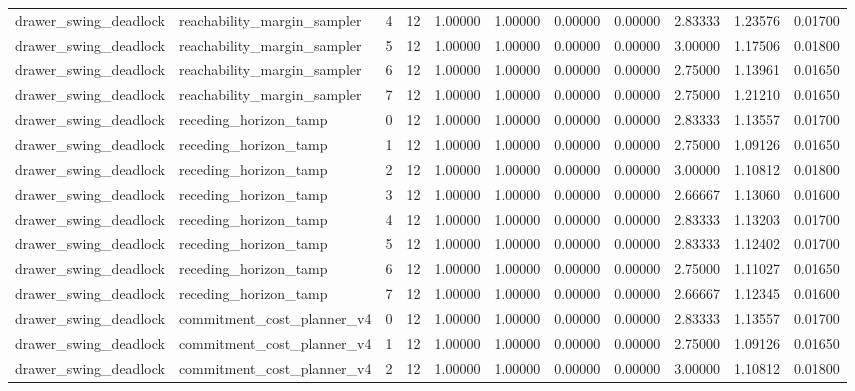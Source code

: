 \documentclass{article}
\begin{document}
\begin{table}[tbp]
{\begin{tabular}{lllllllllll}
drawer\_swing\_deadlock & reachability\_margin\_sampler & 4 & 12 & 1.00000 & 1.00000 & 0.00000 & 0.00000 & 2.83333 & 1.23576 & 0.01700 \\
drawer\_swing\_deadlock & reachability\_margin\_sampler & 5 & 12 & 1.00000 & 1.00000 & 0.00000 & 0.00000 & 3.00000 & 1.17506 & 0.01800 \\
drawer\_swing\_deadlock & reachability\_margin\_sampler & 6 & 12 & 1.00000 & 1.00000 & 0.00000 & 0.00000 & 2.75000 & 1.13961 & 0.01650 \\
drawer\_swing\_deadlock & reachability\_margin\_sampler & 7 & 12 & 1.00000 & 1.00000 & 0.00000 & 0.00000 & 2.75000 & 1.21210 & 0.01650 \\
drawer\_swing\_deadlock & receding\_horizon\_tamp & 0 & 12 & 1.00000 & 1.00000 & 0.00000 & 0.00000 & 2.83333 & 1.13557 & 0.01700 \\
drawer\_swing\_deadlock & receding\_horizon\_tamp & 1 & 12 & 1.00000 & 1.00000 & 0.00000 & 0.00000 & 2.75000 & 1.09126 & 0.01650 \\
drawer\_swing\_deadlock & receding\_horizon\_tamp & 2 & 12 & 1.00000 & 1.00000 & 0.00000 & 0.00000 & 3.00000 & 1.10812 & 0.01800 \\
drawer\_swing\_deadlock & receding\_horizon\_tamp & 3 & 12 & 1.00000 & 1.00000 & 0.00000 & 0.00000 & 2.66667 & 1.13060 & 0.01600 \\
drawer\_swing\_deadlock & receding\_horizon\_tamp & 4 & 12 & 1.00000 & 1.00000 & 0.00000 & 0.00000 & 2.83333 & 1.13203 & 0.01700 \\
drawer\_swing\_deadlock & receding\_horizon\_tamp & 5 & 12 & 1.00000 & 1.00000 & 0.00000 & 0.00000 & 2.83333 & 1.12402 & 0.01700 \\
drawer\_swing\_deadlock & receding\_horizon\_tamp & 6 & 12 & 1.00000 & 1.00000 & 0.00000 & 0.00000 & 2.75000 & 1.11027 & 0.01650 \\
drawer\_swing\_deadlock & receding\_horizon\_tamp & 7 & 12 & 1.00000 & 1.00000 & 0.00000 & 0.00000 & 2.66667 & 1.12345 & 0.01600 \\
drawer\_swing\_deadlock & commitment\_cost\_planner\_v4 & 0 & 12 & 1.00000 & 1.00000 & 0.00000 & 0.00000 & 2.83333 & 1.13557 & 0.01700 \\
drawer\_swing\_deadlock & commitment\_cost\_planner\_v4 & 1 & 12 & 1.00000 & 1.00000 & 0.00000 & 0.00000 & 2.75000 & 1.09126 & 0.01650 \\
drawer\_swing\_deadlock & commitment\_cost\_planner\_v4 & 2 & 12 & 1.00000 & 1.00000 & 0.00000 & 0.00000 & 3.00000 & 1.10812 & 0.01800 \\

\end{tabular}}
\end{table}
\end{document}
